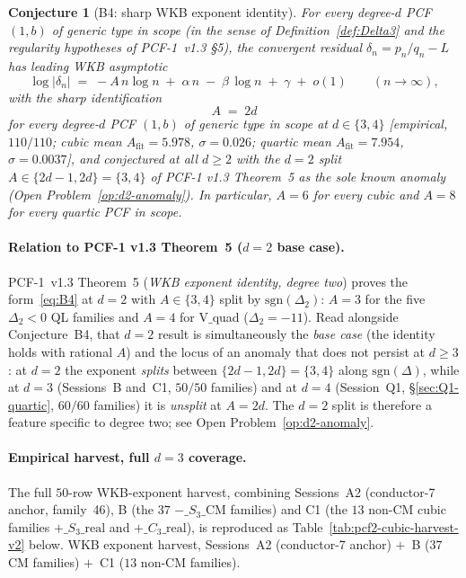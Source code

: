 \documentclass[11pt,a4paper]{article}
\newtheorem{conjecture}{Conjecture}
\theoremstyle{definition}
\theoremstyle{remark}
\begin{document}
\begin{conjecture}[B4: sharp WKB exponent identity]\label{conj:B4}
For every degree-$d$ PCF $(1,b)$ of generic type in scope (in the sense
of Definition~\ref{def:Delta3} and the regularity hypotheses of
PCF-1~v1.3 \S{}5), the convergent residual $\delta_{n}=p_{n}/q_{n}-L$
has leading WKB asymptotic
\begin{equation}\label{eq:B4}
\log|\delta_{n}|\;=\;-A\,n\log n\;+\;\alpha\, n\;-\;\beta\,\log n\;+\;\gamma\;+\;o(1)
\qquad (n\to\infty),
\end{equation}
with the sharp identification
\[
\boxed{\;A\;=\;2d\;}
\]
for every degree-$d$ PCF $(1,b)$ of generic type in scope at
$d\in\{3,4\}$ [empirical, $110/110$; cubic mean
$A_{\mathrm{fit}}=5.978$, $\sigma=0.026$; quartic mean
$A_{\mathrm{fit}}=7.954$, $\sigma=0.0037$], and conjectured at all
$d\ge 2$ with the $d=2$ split $A\in\{2d-1,2d\}=\{3,4\}$ of PCF-1 v1.3
Theorem~5 as the sole known anomaly
(Open Problem~\ref{op:d2-anomaly}). In particular, $A=6$ for every
cubic and $A=8$ for every quartic PCF in scope.
\end{conjecture}

\paragraph{Relation to PCF-1 v1.3 Theorem~5 ($d=2$ base case).}
PCF-1~v1.3 Theorem~5 (\emph{WKB exponent identity, degree two}) proves
the form~\eqref{eq:B4} at $d=2$ with $A\in\{3,4\}$ split by
$\mathrm{sgn}(\Delta_{2})$: $A=3$ for the five $\Delta_{2}<0$ QL
families and $A=4$ for V$\_$quad ($\Delta_{2}=-11$). Read alongside
Conjecture~B4, that $d=2$ result is simultaneously the \emph{base
case} (the identity holds with rational $A$) and the locus of an
anomaly that does not persist at $d\ge 3$: at $d=2$ the exponent
\emph{splits} between $\{2d-1, 2d\}=\{3, 4\}$ along
$\mathrm{sgn}(\Delta)$, while at $d=3$ (Sessions~B and~C1, $50/50$
families) and at $d=4$ (Session~Q1, \S\ref{sec:Q1-quartic},
$60/60$ families) it is \emph{unsplit} at $A=2d$. The $d=2$ split is
therefore a feature specific to degree two; see Open
Problem~\ref{op:d2-anomaly}.

\paragraph{Empirical harvest, full $d=3$ coverage.}
The full $50$-row WKB-exponent harvest, combining
Sessions~A2 (conductor-7 anchor, family~46),
B (the $37$ $-\_S_3\_\mathrm{CM}$ families) and
C1 (the $13$ non-CM cubic families
$+\_S_3\_\mathrm{real}$ and $+\_C_3\_\mathrm{real}$), is reproduced as
Table~\ref{tab:pcf2-cubic-harvest-v2} below.
WKB exponent harvest, Sessions~A2 (conductor-7 anchor)
$+$~B ($37$ CM families) $+$~C1 ($13$ non-CM families).
\end{document}
